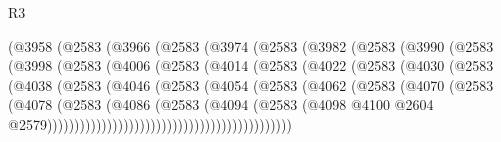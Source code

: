 \begin{lexlean}{R3}
\begin{coremodule}
                    (@3958
                      (@2583
                        (@3966
                          (@2583
                            (@3974
                              (@2583
                                (@3982
                                  (@2583
                                    (@3990
                                      (@2583
                                        (@3998
                                          (@2583
                                            (@4006
                                              (@2583
                                                (@4014
                                                  (@2583
                                                    (@4022
                                                      (@2583
                                                        (@4030
                                                          (@2583
                                                            (@4038
                                                              (@2583
                                                                (@4046
                                                                  (@2583
                                                                    (@4054
                                                                      (@2583
                                                                        (@4062
                                                                          (@2583
                                                                            (@4070
                                                                              (@2583
                                                                                (@4078
                                                                                  (@2583
                                                                                    (@4086
                                                                                      (@2583
                                                                                        (@4094
                                                                                          (@2583
                                                                                            (@4098
                                                                                              @4100
                                                                                              @2604
                                                                                              @2579)))))))))))))))))))))))))))))))))))))))))))))

\end{coremodule}
\end{lexlean}
